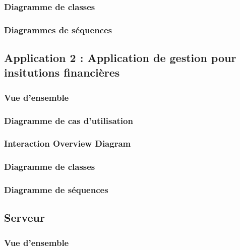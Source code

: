 \documentclass{article}
\begin{document}
				
		
		\subsubsection{Diagramme de classes}

		\subsubsection{Diagrammes de séquences}
		
	\subsection{Application 2 : Application de gestion pour insitutions financières}

		\subsubsection{Vue d'ensemble}

		\subsubsection{Diagramme de cas d'utilisation}

		\subsubsection{Interaction Overview Diagram}

				

		\subsubsection{Diagramme de classes}

		\subsubsection{Diagramme de séquences}
	
	\subsection{Serveur}
	
		\subsubsection{Vue d'ensemble}
		
\end{document}
